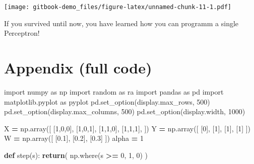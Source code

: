 \documentclass[
]{book}
\newenvironment{Shaded}{\begin{snugshade}}{\end{snugshade}}
\newcommand{\ControlFlowTok}[1]{\textcolor[rgb]{0.13,0.29,0.53}{\textbf{#1}}}
\newcommand{\DecValTok}[1]{\textcolor[rgb]{0.00,0.00,0.81}{#1}}
\newcommand{\FloatTok}[1]{\textcolor[rgb]{0.00,0.00,0.81}{#1}}
\newcommand{\ImportTok}[1]{#1}
\newcommand{\KeywordTok}[1]{\textcolor[rgb]{0.13,0.29,0.53}{\textbf{#1}}}
\newcommand{\NormalTok}[1]{#1}
\newcommand{\OperatorTok}[1]{\textcolor[rgb]{0.81,0.36,0.00}{\textbf{#1}}}
\newcommand{\StringTok}[1]{\textcolor[rgb]{0.31,0.60,0.02}{#1}}
\begin{document}
\texttt{[image: gitbook-demo\_files/figure-latex/unnamed-chunk-11-1.pdf]}

If you survived until now, you have learned how you can programm a single Perceptron!

\hypertarget{appendix-full-code}{%
\section{Appendix (full code)}\label{appendix-full-code}}

\begin{Shaded}
\begin{Highlighting}[]
\ImportTok{import}\NormalTok{ numpy }\ImportTok{as}\NormalTok{ np}
\ImportTok{import}\NormalTok{ random }\ImportTok{as}\NormalTok{ ra}
\ImportTok{import}\NormalTok{ pandas }\ImportTok{as}\NormalTok{ pd}
\ImportTok{import}\NormalTok{ matplotlib.pyplot }\ImportTok{as}\NormalTok{ pyplot}
\NormalTok{pd.set\_option(}\StringTok{\textquotesingle{}display.max\_rows\textquotesingle{}}\NormalTok{, }\DecValTok{500}\NormalTok{)}
\NormalTok{pd.set\_option(}\StringTok{\textquotesingle{}display.max\_columns\textquotesingle{}}\NormalTok{, }\DecValTok{500}\NormalTok{)}
\NormalTok{pd.set\_option(}\StringTok{\textquotesingle{}display.width\textquotesingle{}}\NormalTok{, }\DecValTok{1000}\NormalTok{)}

\NormalTok{X }\OperatorTok{=}\NormalTok{ np.array([}
\NormalTok{  [}\DecValTok{1}\NormalTok{,}\DecValTok{0}\NormalTok{,}\DecValTok{0}\NormalTok{],}
\NormalTok{  [}\DecValTok{1}\NormalTok{,}\DecValTok{0}\NormalTok{,}\DecValTok{1}\NormalTok{],}
\NormalTok{  [}\DecValTok{1}\NormalTok{,}\DecValTok{1}\NormalTok{,}\DecValTok{0}\NormalTok{],}
\NormalTok{  [}\DecValTok{1}\NormalTok{,}\DecValTok{1}\NormalTok{,}\DecValTok{1}\NormalTok{],}
\NormalTok{])}
\NormalTok{Y }\OperatorTok{=}\NormalTok{ np.array([}
\NormalTok{  [}\DecValTok{0}\NormalTok{],}
\NormalTok{  [}\DecValTok{1}\NormalTok{],}
\NormalTok{  [}\DecValTok{1}\NormalTok{],}
\NormalTok{  [}\DecValTok{1}\NormalTok{]}
\NormalTok{])}
\NormalTok{W }\OperatorTok{=}\NormalTok{ np.array([}
\NormalTok{  [}\FloatTok{0.1}\NormalTok{], }
\NormalTok{  [}\FloatTok{0.2}\NormalTok{], }
\NormalTok{  [}\FloatTok{0.3}\NormalTok{]}
\NormalTok{])}
\NormalTok{alpha }\OperatorTok{=} \DecValTok{1}


\KeywordTok{def}\NormalTok{ step(s):}
  \ControlFlowTok{return}\NormalTok{( np.where(s }\OperatorTok{\textgreater{}=} \DecValTok{0}\NormalTok{, }\DecValTok{1}\NormalTok{, }\DecValTok{0}\NormalTok{) )}



\end{Highlighting}
\end{Shaded}
\end{document}
